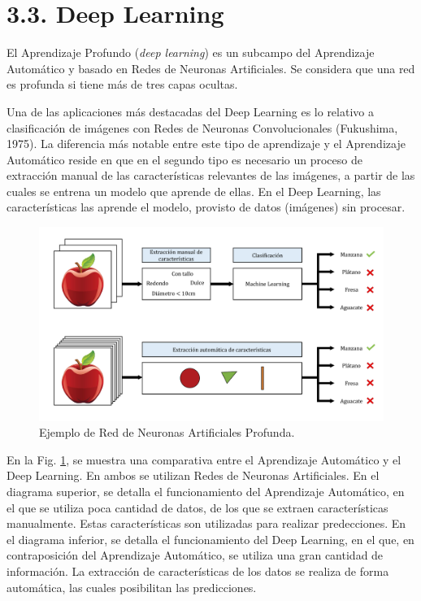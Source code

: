 \documentclass[spanish,a4paper,12pt,twoside]{report}
\begin{document}
    \section*{\Large 3.3. Deep Learning}
    El Aprendizaje Profundo (\emph{deep learning}) es un subcampo del Aprendizaje Automático y basado en Redes de Neuronas Artificiales. Se considera que una red es profunda si tiene más de tres capas ocultas. \par
    Una de las aplicaciones más destacadas del Deep Learning es lo relativo a clasificación de imágenes con Redes de Neuronas Convolucionales (Fukushima, 1975). La diferencia más notable entre este tipo de aprendizaje y el Aprendizaje Automático reside en que en el segundo tipo es necesario un proceso de extracción manual de las características relevantes de las imágenes, a partir de las cuales se entrena un modelo que aprende de ellas. En el Deep Learning, las características las aprende el modelo, provisto de datos (imágenes) sin procesar. \par
    \begin{figure}[H]
      \centering
      \includegraphics[width = 1\textwidth]{resources/Fig13.pdf}
      \caption{Ejemplo de Red de Neuronas Artificiales Profunda.}
      \label{fig:13}
    \end{figure}
    En la Fig. \ref{fig:13}, se muestra una comparativa entre el Aprendizaje Automático y el Deep Learning. En ambos se utilizan Redes de Neuronas Artificiales. En el diagrama superior, se detalla el funcionamiento del Aprendizaje Automático, en el que se utiliza poca cantidad de datos, de los que se extraen características manualmente. Estas características son utilizadas para realizar predecciones. En el diagrama inferior, se detalla el funcionamiento del Deep Learning, en el que, en contraposición del Aprendizaje Automático, se utiliza una gran cantidad de información. La extracción de características de los datos se realiza de forma automática, las cuales posibilitan las predicciones.
    
\end{document}

